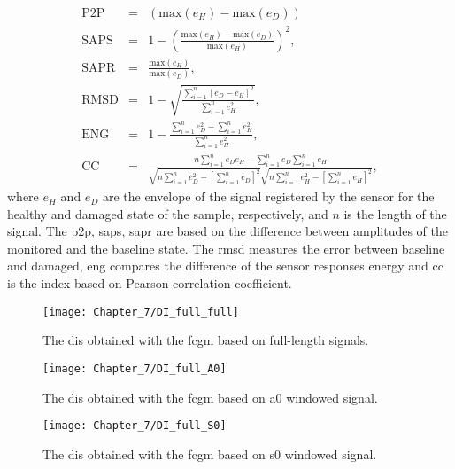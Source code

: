 \begin{eqnarray}
	\mathrm{P2P} & = & \left(\mathrm{max}(e_H) - \mathrm{max}(e_D)\right)\\
	\mathrm{SAPS} & = & 1 - \left(\frac{\mathrm{max}(e_H)-\mathrm{max}(e_D)}{\mathrm{max}(e_H)}\right)^2,\\
	\mathrm{SAPR} & = & \frac{\mathrm{max}(e_H)}{\mathrm{max}(e_D)},\\
	\mathrm{RMSD} & = & 1 - \sqrt{\frac{\sum_{i=1}^{n}\left[e_D-e_H\right]^2}	{\sum_{i=1}^{n}e_H^2}},\\
	\mathrm{ENG} & = & 1 -  \frac{\sum_{i=1}^{n}{e_D^2}-\sum_{i=1}^{n}{e_H^2}}{\sum_{i=1}^{n}{e_H^2}},\\
	\mathrm{CC} & = & \frac{n\sum_{i=1}^{n}e_De_H-\sum_{i=1}^{n}e_D\sum_{i=1}^{n}e_H}{\sqrt{n\sum_{i=1}^{n}e_D^2-\left[\sum_{i=1}^{n}e_D\right]^2}\sqrt{n\sum_{i=1}^{n}e_H^2-\left[\sum_{i=1}^{n}e_H\right]^2}},
\end{eqnarray}
where \(e_H\) and \(e_D\) are the envelope of the signal registered by the sensor for the healthy and damaged state of the sample, respectively, and \(n\) is the length of the signal.
The \ac{p2p}, \ac{saps}, \ac{sapr}  are based on the difference between amplitudes of the monitored and the baseline state.
The \ac{rmsd} measures the error between baseline and damaged, \ac{eng} compares the difference of the sensor responses energy and \ac{cc} is the index based on Pearson correlation coefficient.

\begin{figure}[!tbh]
	\begin{center}
		\texttt{[image: Chapter\_7/DI\_full\_full]}
	\end{center}
	\caption{The \acfp{di} obtained with the \acf{fcgm} based on full-length signals.}
	\label{fig:DI_full_full}
\end{figure}
\begin{figure}[!tbh]
	\begin{center}
		\texttt{[image: Chapter\_7/DI\_full\_A0]}
	\end{center}
	\caption{The \acfp{di} obtained with the \acf{fcgm} based on \acs{a0} windowed signal.}
	\label{fig:DI_full_A0}
\end{figure}
\begin{figure}[!tbh]
	\begin{center}
		\texttt{[image: Chapter\_7/DI\_full\_S0]}
	\end{center}
	\caption{The \acfp{di} obtained with the \acf{fcgm} based on \acs{s0} windowed signal.}
	\label{fig:DI_full_S0}
\end{figure}

